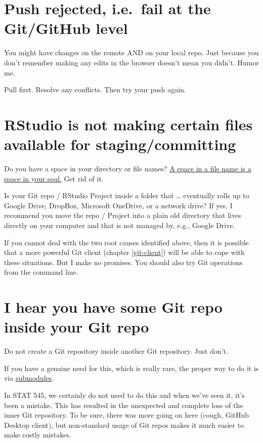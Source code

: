 \documentclass[
]{book}
\begin{document}
\section{Push rejected, i.e.~fail at the Git/GitHub level}\label{push-rejected-i.e.-fail-at-the-gitgithub-level}

You might have changes on the remote AND on your local repo.
Just because you don't remember making any edits in the browser doesn't mean you didn't.
Humor me.

Pull first.
Resolve any conflicts.
Then try your push again.

\section{RStudio is not making certain files available for staging/committing}\label{rstudio-is-not-making-certain-files-available-for-stagingcommitting}

Do you have a space in your directory or file names? \href{https://twitter.com/aaronquinlan/status/711593127551733761}{A space in a file name is a space in your soul.}
Get rid of it.

Is your Git repo / RStudio Project inside a folder that \ldots{} eventually rolls up to Google Drive, DropBox, Microsoft OneDrive, or a network drive?
If yes, I recommend you move the repo / Project into a plain old directory that lives directly on your computer and that is not managed by, e.g., Google Drive.

If you cannot deal with the two root causes identified above, then it is possible that a more powerful Git client (chapter \ref{git-client}) will be able to cope with these situations.
But I make no promises.
You should also try Git operations from the command line.

\section{I hear you have some Git repo inside your Git repo}\label{i-hear-you-have-some-git-repo-inside-your-git-repo}

Do not create a Git repository inside another Git repository. Just don't.

If you have a genuine need for this, which is really rare, the proper way to do it is via \href{http://git-scm.com/book/en/v2/Git-Tools-Submodules}{submodules}.

In STAT 545, we certainly do not need to do this and when we've seen it, it's been a mistake.
This has resulted in the unexpected and complete loss of the inner Git repository.
To be sure, there was more going on here (cough, GitHub Desktop client), but non-standard usage of Git repos makes it much easier to make costly mistakes.
\end{document}
